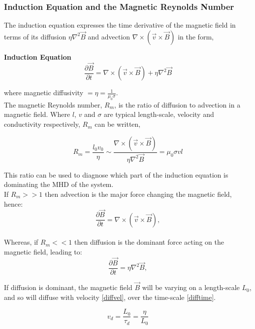  
\subsubsection{Induction Equation and the Magnetic Reynolds Number}
The induction equation expresses the time derivative of the magnetic field in terms of its diffusion $\eta\nabla^{2}\vec{B}$ and advection $\nabla\times(\vec{v}\times\vec{B})$ in the form, 

\textbf{Induction Equation}
\begin{equation}\label{induction}
\frac{\partial \vec{B}}{\partial t}=\nabla\times(\vec{v}\times\vec{B})+\eta\nabla^{2}\vec{B}  
\end{equation}

where magnetic diffusivity $=\eta =\frac{1}{\mu_{0}\sigma}$. \\

The magnetic Reynolds number, $R_m$, is the ratio of diffusion to advection in a magnetic field. Where $l$, $v$ and $\sigma$ are typical length-scale, velocity and conductivity respectively, $R_m$ can be written,  

\begin{equation}\label{reynolds}
R_{m} = \frac{l_{0}v_{0}}{\eta} \sim \frac{\nabla\times(\vec{v}\times\vec{B})}{\eta\nabla^{2}\vec{B}}=\mu_{0}\sigma v l
\end{equation}

This ratio can be used to diagnose which part of the induction equation is dominating the MHD of the system. \\

If $R_m >> 1$ then advection is the major force changing the magnetic field, hence:
\begin{equation}\label{r>>1}
\frac{\partial \vec{B}}{\partial t}=\nabla\times(\vec{v}\times\vec{B}),
\end{equation}
\\

Whereas, if $R_m << 1$ then diffusion is the dominant force acting on the magnetic field, leading to:
\begin{equation}\label{r<<1}
\frac{\partial \vec{B}}{\partial t}=\eta\nabla^{2}\vec{B},
\end{equation}

If diffusion is dominant, the magnetic field $\vec{B}$ will be varying on a length-scale $L_0$, and so will diffuse with velocity \ref{diffvel}, over the time-scale \ref{difftime}.

\begin{equation}\label{diffvel}
v_d=\frac{L_0}{\tau_d} = \frac{\eta}{L_0}
\end{equation}



